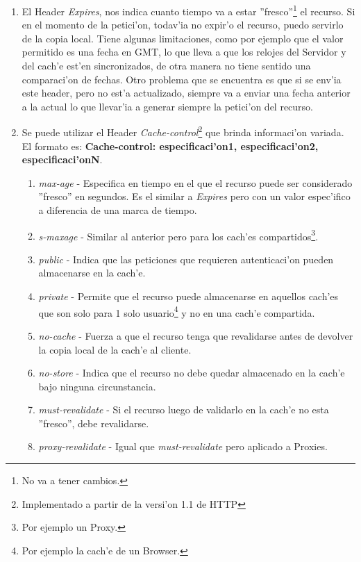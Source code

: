 \begin{enumerate}
\item El Header \textsl{Expires}, nos indica cuanto tiempo va a estar ''fresco''\footnote{No va a tener cambios.} el recurso. Si en el momento de la petici'on, todav'ia no expir'o el recurso, puedo servirlo de la copia local. Tiene algunas limitaciones, como por ejemplo que el valor permitido es una fecha en GMT, lo que lleva a que los relojes del Servidor y del cach'e est'en sincronizados, de otra manera no tiene sentido una comparaci'on de fechas. Otro problema que se encuentra es que si se env'ia este header, pero no est'a actualizado, siempre va a enviar una fecha anterior a la actual lo que llevar'ia a generar siempre la petici'on del recurso.
\item Se puede utilizar el Header \textsl{Cache-control}\footnote{Implementado a partir de la versi'on 1.1 de HTTP} que brinda informaci'on variada. El formato es: \textbf{Cache-control: especificaci'on1, especificaci'on2, especificaci'onN}.
	\begin{enumerate}
	\item \textsl{max-age} - Especifica en tiempo en el que el recurso puede ser considerado ''fresco'' en segundos. Es el similar a \textsl{Expires} pero con un valor espec'ifico a diferencia de una marca de tiempo.
	\item \textsl{s-maxage} - Similar al anterior pero para los cach'es compartidos\footnote{Por ejemplo un Proxy.}.
	\item \textsl{public} - Indica que las peticiones que requieren autenticaci'on pueden almacenarse en la cach'e.
	\item \textsl{private} - Permite que el recurso puede almacenarse en aquellos cach'es que son solo para 1 solo usuario\footnote{Por ejemplo la cach'e de un Browser.} y no en una cach'e compartida.
	\item \textsl{no-cache} - Fuerza a que el recurso tenga que revalidarse antes de devolver la copia local de la cach'e al cliente.
	\item \textsl{no-store} - Indica que el recurso no debe quedar almacenado en la cach'e bajo ninguna circunstancia.
	\item \textsl{must-revalidate} - Si el recurso luego de validarlo en la cach'e no esta ''fresco'', debe revalidarse.
	\item \textsl{proxy-revalidate} - Igual que \textsl{must-revalidate} pero aplicado a Proxies.
	\end{enumerate}
\end{enumerate}

